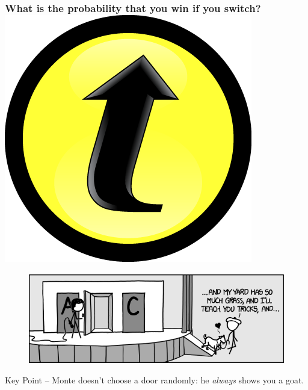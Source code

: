 \documentclass[handout]{beamer}
\begin{document}
\begin{frame}
\frametitle{What is the probability that you win if you switch? \hfill \includegraphics[scale = 0.05]{./images/clicker}}
\begin{figure}
\centering
	\includegraphics[scale = 0.55]{./images/monty_hall}
\end{figure}
\end{frame}
\begin{frame}

\Huge Key Point -- Monte doesn't choose a door randomly: he \emph{always} shows you a goat.

\end{frame}
\end{document}
